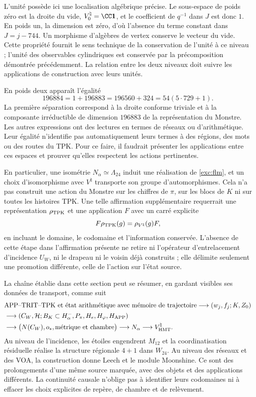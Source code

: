 L'unité possède ici une localisation algébrique précise. Le sous-espace de poids zéro est la droite du vide, \(V^\natural_0=\CC\mathbf1\), et le coefficient de \(q^{-1}\) dans \(J\) est donc \(1\). En poids un, la dimension est zéro, d'où l'absence du terme constant dans \(J=j-744\). Un morphisme d'algèbres de vertex conserve le vecteur du vide. Cette propriété fournit le sens technique de la conservation de l'unité à ce niveau ; l'unité des observables cylindriques est conservée par la précomposition démontrée précédemment. La relation entre les deux niveaux doit suivre les applications de construction avec leurs unités.

En poids deux apparaît l'égalité
\[
 196884=1+196883=196560+324=54(5\cdot729+1).
\]
La première séparation correspond à la droite conforme triviale et à la
composante irréductible de dimension $196883$ de la représentation
du Monstre. Les autres expressions ont des lectures en termes de réseaux ou
d'arithmétique. Leur égalité n'identifie pas automatiquement leurs termes
à des régions, des mots ou des routes du TPK. Pour ce faire, il faudrait
présenter les applications entre ces espaces et prouver qu'elles respectent les
actions pertinentes.

En particulier, une isométrie $N_\alpha\simeq\Lambda_{24}$ induit
une réalisation de \eqref{exc:flm}, et un choix d'isomorphisme
avec $V^\natural$ transporte son groupe d'automorphismes. Cela n'a pas
construit une action du Monstre sur les chiffres de
$\pi$, sur les blocs de $K$ ni sur toutes les histoires TPK.
Une telle affirmation supplémentaire requerrait une représentation
$\rho_{\rm TPK}$ et une application $F$ avec un carré explicite
\[
 F\rho_{\rm TPK}(g)=\rho_{V^\natural}(g)F,
\]
en incluant le domaine, le codomaine et l'information conservée. L'absence
de cette étape dans l'affirmation présente ne retire ni l'opérateur d'entrelacement
d'incidence $U_W$, ni le drapeau ni le voisin déjà construits ; elle
délimite seulement une promotion différente, celle de l'action sur l'état source.

La chaîne établie dans cette section peut se résumer, en gardant visibles ses données de transport, comme suit
\begin{align*}
 &\text{APP--TRIT--TPK et état arithmétique avec mémoire de trajectoire}
   \longrightarrow (w_j,f_j;K,Z_0)\\
 &\longrightarrow (C_W,\mathcal H;B_K\subset H^-_\alpha,
                   P_\pi,H_e,H_\varphi,H_{\rm APP})\\
 &\longrightarrow \bigl(N(C_W),o_*,\text{métrique et chambre}\bigr)
   \longrightarrow N_\alpha
   \longrightarrow V^\natural_{\rm HMT}.
\end{align*}
Au niveau de l'incidence, les étoiles engendrent $M_{12}$ et la
coordinatisation résiduelle réalise la structure régionale $4+1$ dans $W_{24}$.
Au niveau des réseaux et des VOA, la construction donne Leech et le module
Moonshine. Ce sont des prolongements d'une même source marquée, avec
des objets et des applications différents. La continuité causale n'oblige pas à
identifier leurs codomaines ni à effacer les choix explicites
de repère, de chambre et de relèvement.


